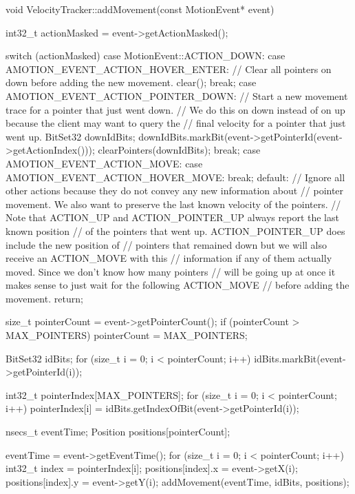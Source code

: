 void VelocityTracker::addMovement(const MotionEvent* event) {
    
    int32_t actionMasked = event->getActionMasked();
    
    switch (actionMasked) {
        case MotionEvent::ACTION_DOWN:
        case AMOTION_EVENT_ACTION_HOVER_ENTER:
            // Clear all pointers on down before adding the new movement.
            clear();
            break;
        case AMOTION_EVENT_ACTION_POINTER_DOWN: {
            // Start a new movement trace for a pointer that just went down.
            // We do this on down instead of on up because the client may want to query the
            // final velocity for a pointer that just went up.
            BitSet32 downIdBits;
            downIdBits.markBit(event->getPointerId(event->getActionIndex()));
            clearPointers(downIdBits);
            break;
        }
        case AMOTION_EVENT_ACTION_MOVE:
        case AMOTION_EVENT_ACTION_HOVER_MOVE:
            break;
        default:
            // Ignore all other actions because they do not convey any new information about
            // pointer movement.  We also want to preserve the last known velocity of the pointers.
            // Note that ACTION_UP and ACTION_POINTER_UP always report the last known position
            // of the pointers that went up.  ACTION_POINTER_UP does include the new position of
            // pointers that remained down but we will also receive an ACTION_MOVE with this
            // information if any of them actually moved.  Since we don't know how many pointers
            // will be going up at once it makes sense to just wait for the following ACTION_MOVE
            // before adding the movement.
            return;
    }
    
    size_t pointerCount = event->getPointerCount();
    if (pointerCount > MAX_POINTERS) {
        pointerCount = MAX_POINTERS;
    }
    
    BitSet32 idBits;
    for (size_t i = 0; i < pointerCount; i++) {
        idBits.markBit(event->getPointerId(i));
    }
    
    int32_t pointerIndex[MAX_POINTERS];
    for (size_t i = 0; i < pointerCount; i++) {
        pointerIndex[i] = idBits.getIndexOfBit(event->getPointerId(i));
    }
    
    nsecs_t eventTime;
    Position positions[pointerCount];
    
    eventTime = event->getEventTime();
    for (size_t i = 0; i < pointerCount; i++) {
        int32_t index = pointerIndex[i];
        positions[index].x = event->getX(i);
        positions[index].y = event->getY(i);
    }
    addMovement(eventTime, idBits, positions);
}

